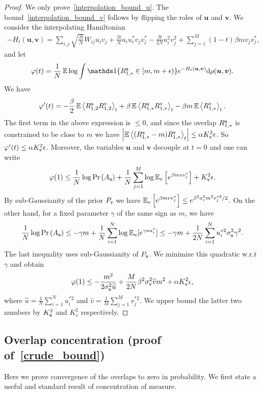 \documentclass[final,12pt]{colt2018} %
\newcommand{\utt}{\textup{\texttt{u}}}
\newcommand{\vtt}{\textup{\texttt{v}}}
\renewcommand{\u}{\bm{u}}
\renewcommand{\v}{\bm{v}}
\begin{document}
\begin{proof}
We only prove~\eqref{interpolation_bound_u}. The bound~\eqref{interpolation_bound_v} follows by flipping the roles of $\u$ and $\v$.  
We consider the interpolating Hamiltonian
\begin{align*}
-H_t(\u,\v) = \sum_{i,j}\sqrt{\frac{\beta t}{N}}W_{ij}u_iv_j + \frac{\beta t}{N}u_iu_i^*v_jv_j^*- \frac{\beta t}{2N} u_i^2v_j^2
+ \sum_{j=1}^M (1-t)\beta mv_jv_j^*,
\end{align*}
and let
\[\varphi(t) = \frac{1}{N}\E\log \int \indi\{R^{\utt}_{1,*} \in [m,m+\epsilon)\} e^{-H_t(\u,\v)}\rmd \rho(\u,\v).\]
We have
\[\varphi'(t) = -\frac{\beta}{2}\E \left\langle  R^{\utt}_{1,2}R^{\vtt}_{1,2} \right\rangle_t + \beta\E \left\langle  R^{\utt}_{1,*}R^{\vtt}_{1,*} \right\rangle_t - \beta m\E \left\langle  R^{\vtt}_{1,*} \right\rangle_t.\]
The first term in the above expression is $\le 0$, and since the overlap $R_{1,*}^\utt$ is constrained to be close to $m$ we have $\abs{\E \left\langle  (R^{\utt}_{1,*}-m)R^{\vtt}_{1,*} \right\rangle_t} \le  \alpha K_{\vtt}^2\epsilon$. So $\varphi'(t) \le \alpha K_{\vtt}^2\epsilon$. Moreover, the variables $\u$ and $\v$ decouple at $t=0$ and one can write
\[\varphi(1) \le  \frac{1}{N}\log \Pr\left(A_{\utt}\right) + \frac{1}{N}\sum_{j=1}^M\log \E_{v}\left[ e^{\beta mvv_j^*}\right] + K_{\vtt}^2\epsilon.\] 
By sub-Gaussianity of the prior $P_{\vtt}$ we have $\E_{v}\left[ e^{\beta mvv_j^*}\right] \le e^{\beta^2 \sigma_{\vtt}^2m^2 v_j^{*2}/2}$. On the other hand, for a fixed parameter $\gamma$ of the same sign as $m $, we have
\[ \frac{1}{N}\log \Pr \left(A_{\utt}\right) \le -\gamma m+\frac{1}{N}\sum_{i=1}^N\log \E_{u}[e^{\gamma uu_i^*}] \le -\gamma m + \frac{1}{2N}\sum_{i=1}^N u_i^{*2}\sigma_{\utt}^2\gamma^2.\] 
The last inequality uses sub-Gaussianity of $P_{\utt}$. We minimize this quadratic w.r.t\ $\gamma$ and obtain
\[\varphi(1) \le - \frac{m^2}{2\sigma_{\utt}^2\widehat{u}} + \frac{M}{2N} \beta^2 \sigma_{\vtt}^2\widehat{v} m^2 + \alpha K_{\vtt}^2\epsilon,\]
where $\widehat{u} = \frac{1}{N}\sum_{i=1}^Nu_i^{*2}$ and $\widehat{v}=\frac{1}{M}\sum_{j=1}^Mv_j^{*2}$. We upper bound the latter two numbers by $K_{\utt}^2$ and $K_{v}^2$ respectively.
\end{proof}


\subsection{Overlap concentration (proof of~\eqref{crude_bound})}
\label{sxn:proof_of_crude_bound}
Here we prove convergence of the overlaps to zero in probability. We first state a useful and standard result of concentration of measure.  
\end{document}
